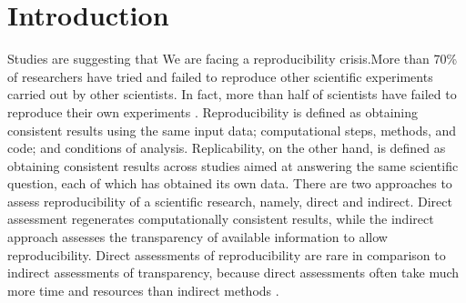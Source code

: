 \documentclass[
10pt, %
a4paper, %
oneside, %
headinclude,footinclude, %
BCOR5mm, %
]{scrartcl}
\begin{document}
\let\thefootnote\relax{}





\section{Introduction}


Studies are suggesting that We are facing a reproducibility crisis.More than 70\% of researchers have tried and failed to reproduce other scientific experiments carried out by other scientists. In fact, more than half of scientists have failed to reproduce their own experiments \cite{Baker2016}.
Reproducibility is defined as obtaining consistent results using the same input data; computational steps, methods, and code; and conditions of analysis.
Replicability, on the other hand, is defined as obtaining consistent results across studies aimed at answering the same scientific question, each of which has obtained its own data.
There are two approaches to assess reproducibility of a scientific research, namely, direct and indirect.
Direct assessment regenerates computationally consistent results, while the indirect approach assesses the transparency of available information to allow reproducibility.
Direct assessments of reproducibility are rare in comparison to indirect assessments of transparency, because direct assessments often take much more time and resources than indirect methods \cite{national2019reproducibility}.
\end{document}
